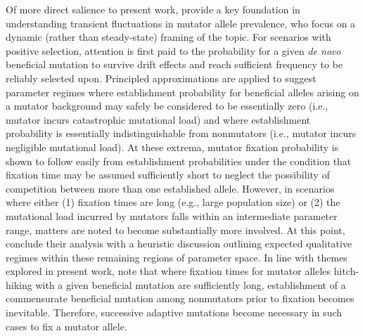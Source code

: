 Of more direct salience to present work, \citet{desai2011balance} provide a key foundation in understanding transient fluctuations in mutator allele prevalence, who focus on a dynamic (rather than steady-state) framing of the topic.
For scenarios with positive selection, attention is first paid to the probability for a given \textit{de novo} beneficial mutation to survive drift effects and reach sufficient frequency to be reliably selected upon.
Principled approximations are applied to suggest parameter regimes where establishment probability for beneficial alleles arising on a mutator background may safely be considered to be essentially zero (i.e., mutator incurs catastrophic mutational load) and where establishment probability is essentially indistinguishable from nonmutators (i.e., mutator incurs negligible mutational load).
At these extrema, mutator fixation probability is shown to follow easily from establishment probabilities under the condition that fixation time may be assumed sufficiently short to neglect the possibility of competition between more than one established allele.
However, in scenarios where either (1) fixation times are long (e.g., large population size) or (2) the mutational load incurred by mutators falls within an intermediate parameter range, matters are noted to become substantially more involved.
At this point, \citet{desai2011balance} conclude their analysis with a heuristic discussion outlining expected qualitative regimes within these remaining regions of parameter space.
In line with themes explored in present work, \citet{desai2011balance} note that where fixation times for mutator alleles hitch-hiking with a given beneficial mutation are sufficiently long, establishment of a commensurate beneficial mutation among nonmutators prior to fixation becomes inevitable.
Therefore, successive adaptive mutations become necessary in such cases to fix a mutator allele.

